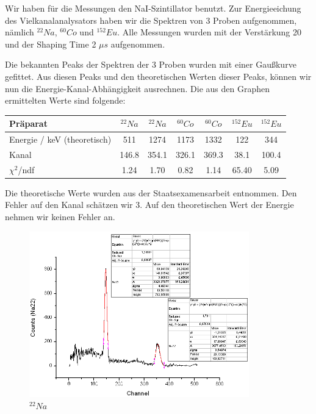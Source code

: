 Wir haben für die Messungen den NaI-Szintillator benutzt. Zur Energieeichung des Vielkanalanalysators haben wir die Spektren von 3 Proben aufgenommen, nämlich $^{22}Na$, $^{60}Co$ und $^{152}Eu$. Alle Messungen wurden mit der Verstärkung 20 und der Shaping Time 2 $\mu s$ aufgenommen.

Die bekannten Peaks der Spektren der 3 Proben wurden mit einer Gaußkurve gefittet. Aus diesen Peaks und den theoretischen Werten dieser Peaks, können wir nun die Energie-Kanal-Abhängigkeit ausrechnen. Die aus den Graphen ermittelten Werte sind folgende:\\

\begin{center}
\begin{tabular}{| l | c | c | c | c | c | c |} \hline
Präparat & $^{22}Na$ & $^{22}Na$ & $^{60}Co$ & $^{60}Co$ & $^{152}Eu$ & $^{152}Eu$\\ \hline
Energie / keV (theoretisch) & 511 & 1274 & 1173 & 1332 & 122 & 344\\ \hline
Kanal & 146.8 & 354.1 & 326.1 & 369.3 & 38.1 & 100.4\\ \hline
$\chi^2$/ndf & 1.24 & 1.70 & 0.82 & 1.14 & 65.40 & 5.09\\ \hline
\end{tabular}
\end{center}

Die theoretische Werte wurden aus der Staatsexamensarbeit entnommen. Den Fehler auf den Kanal schätzen wir 3. Auf den theoretischen Wert der Energie nehmen wir keinen Fehler an.

\begin{figure}
\centering \includegraphics[width = 0.85\textwidth]{auswertung/Na22.png}
\caption{$^{22}Na$}
\end{figure}

